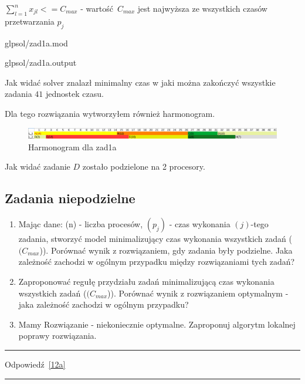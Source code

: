 \documentclass{article}
\begin{document}
$\sum^{n}_{l = 1} x_{jl} <= C_{max}$ - wartość $C_{max}$ jest najwyższa ze wszystkich czasów przetwarzania $p_j$


{glpsol/zad1a.mod}


{glpsol/zad1a.output}

Jak widać solver znalazł minimalny czas w jaki można zakończyć wszystkie zadania $41$ jednostek czasu.

Dla tego rozwiązania wytworzyłem również harmonogram.

\begin{figure}[h]    
  \centering    
  \includegraphics[width=\linewidth]{others/zad1a_harmonogram.png}
  \caption{Harmonogram dla zad1a}
\end{figure}

Jak widać zadanie $D$ zostało podzielone na 2 procesory.

\subsection{Zadania niepodzielne}

\begin{enumerate}[label=(\alph*)]
    \item \label{12a} Mając dane: (n) - liczba procesów, $(p_j)$ - czas wykonania
          $(j)$-tego zadania, stworzyć model minimalizujący czas wykonania
          wszystkich zadań ($(C_{max}$)). Porównać wynik z rozwiązaniem,
          gdy zadania były podzielne.
          Jaka zależność zachodzi w ogólnym przypadku między rozwiązaniami tych zadań?
  \item \label{12b} Zaproponować regułę przydziału zadań minimalizującą czas
          wykonania wszystkich zadań ($(C_{max}$)).
          Porównać wynik z rozwiązaniem optymalnym - jaka zależność zachodzi w ogólnym przypadku?
  \item \label{12c} Mamy Rozwiązanie - niekoniecznie optymalne. Zaproponuj algorytm lokalnej poprawy rozwiązania.
\end{enumerate}

\par\noindent\rule{\textwidth}{0.4pt}
Odpowiedź \ref{12a}
\par\noindent\rule{\textwidth}{0.4pt}
\end{document}
